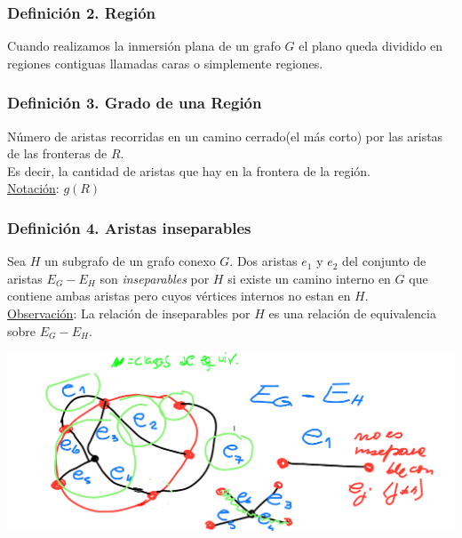 \documentclass{article}
\begin{document}
\subsubsection*{Definición 2. Región}
Cuando realizamos la inmersión plana de un grafo $G$ el plano queda dividido en regiones contiguas llamadas caras o simplemente regiones.

\subsubsection*{Definición 3. Grado de una Región}
Número de aristas recorridas en un camino cerrado(el más corto) por las aristas de las fronteras de $R$.
\\Es decir, la cantidad de aristas que hay en la frontera de la región.
\\\underline{Notación}: $g(R)$

\subsubsection*{Definición 4. Aristas inseparables}
Sea $H$ un subgrafo de un grafo conexo $G$. Dos aristas $e_1$ y $e_2$ del conjunto de aristas $E_G - E_H$ son \emph{inseparables} por $H$ si existe un camino interno en $G$ que contiene
ambas aristas pero cuyos vértices internos no estan en $H$.
\\\underline{Observación}: La relación de inseparables por $H$ es una relación de equivalencia sobre $E_G - E_H$.
\begin{center}
    \includegraphics[width=.70\textwidth]{AristasInseparables.PNG}
\end{center}
\end{document}
